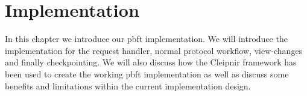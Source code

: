 \chapter{Implementation}

\label{chapter:Imp}
In this chapter we introduce our \ac{pbft} implementation. We will introduce the implementation for the request handler, normal protocol workflow, view-changes and finally checkpointing. We will also discuss how the Cleipnir framework has been used to create the working \ac{pbft} implementation as well as discuss some benefits and limitations within the current implementation design.



